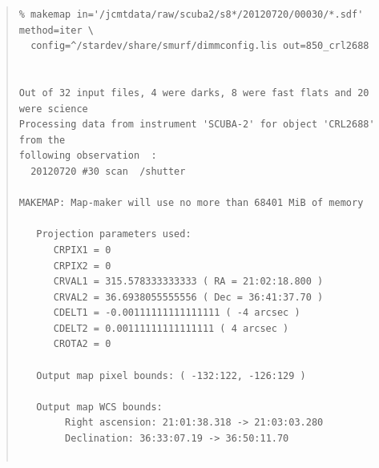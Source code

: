 \documentclass[twoside,11pt]{article}
\renewcommand{\_}{\texttt{\symbol{95}}}
\newenvironment{myquote}{\begin{quote}\begin{small}}{\end{small}\end{quote}}
\begin{document}
\begin{myquote}
\begin{verbatim}
% makemap in='/jcmtdata/raw/scuba2/s8*/20120720/00030/*.sdf' method=iter \
  config=^/stardev/share/smurf/dimmconfig.lis out=850_crl2688


Out of 32 input files, 4 were darks, 8 were fast flats and 20 were science
Processing data from instrument 'SCUBA-2' for object 'CRL2688' from the
following observation  :
  20120720 #30 scan  /shutter

MAKEMAP: Map-maker will use no more than 68401 MiB of memory

   Projection parameters used:
      CRPIX1 = 0
      CRPIX2 = 0
      CRVAL1 = 315.578333333333 ( RA = 21:02:18.800 )
      CRVAL2 = 36.6938055555556 ( Dec = 36:41:37.70 )
      CDELT1 = -0.00111111111111111 ( -4 arcsec )
      CDELT2 = 0.00111111111111111 ( 4 arcsec )
      CROTA2 = 0

   Output map pixel bounds: ( -132:122, -126:129 )

   Output map WCS bounds:
        Right ascension: 21:01:38.318 -> 21:03:03.280
        Declination: 36:33:07.19 -> 36:50:11.70


\end{verbatim}
\end{myquote}
\end{document}

